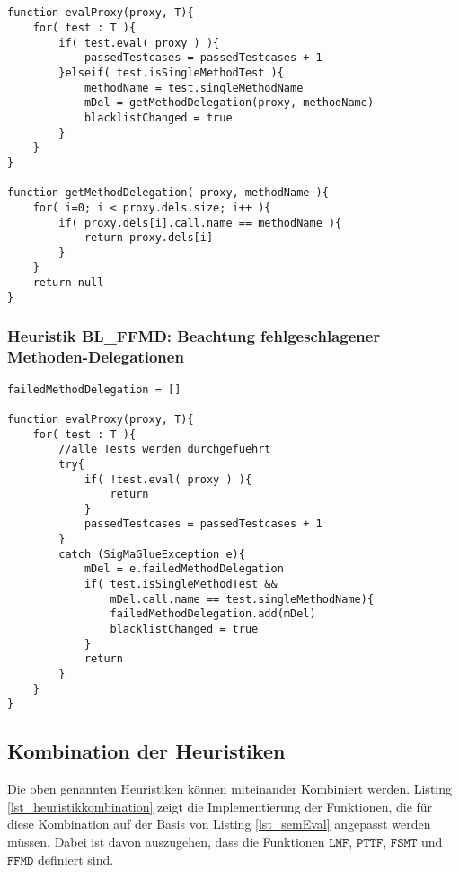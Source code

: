 \begin{lstlisting}[style = pseudo, caption = Semantische Evaluation mit Heuristik SMTE, captionpos = b, label = lst_semEval_SMTE]


function evalProxy(proxy, T){
	for( test : T ){	
		if( test.eval( proxy ) ){
			passedTestcases = passedTestcases + 1
		}elseif( test.isSingleMethodTest ){
			methodName = test.singleMethodName
			mDel = getMethodDelegation(proxy, methodName)
			blacklistChanged = true
		}		
	}
}

function getMethodDelegation( proxy, methodName ){
	for( i=0; i < proxy.dels.size; i++ ){
		if( proxy.dels[i].call.name == methodName ){
			return proxy.dels[i]
		}
	}
	return null
}

\end{lstlisting}



\subsubsection{Heuristik BL\_FFMD: Beachtung fehlgeschlagener Methoden-Delegationen}
\noindent
\newline


\begin{lstlisting}[style = pseudo, caption = Abfangen der SigMaGlueException beim Testen eines Proxies, captionpos = b, label = lst_evalProxyFNDE]
failedMethodDelegation = []

function evalProxy(proxy, T){
	for( test : T ){
		//alle Tests werden durchgefuehrt	
		try{
			if( !test.eval( proxy ) ){
				return
			}
			passedTestcases = passedTestcases + 1
		}
		catch (SigMaGlueException e){
			mDel = e.failedMethodDelegation
			if( test.isSingleMethodTest && 
				mDel.call.name == test.singleMethodName){
				failedMethodDelegation.add(mDel)
				blacklistChanged = true		
			}		
			return
		} 
	}
}
\end{lstlisting}


\subsection{Kombination der Heuristiken}
Die oben genannten Heuristiken können miteinander Kombiniert werden. Listing \ref{lst_heuristikkombination} zeigt die Implementierung der Funktionen, die für diese Kombination auf der Basis von Listing \ref{lst_semEval} angepasst werden müssen. Dabei ist  davon auszugehen, dass die Funktionen $\texttt{LMF}$, $\texttt{PTTF}$, $\texttt{FSMT}$ und $\texttt{FFMD}$ definiert sind.

